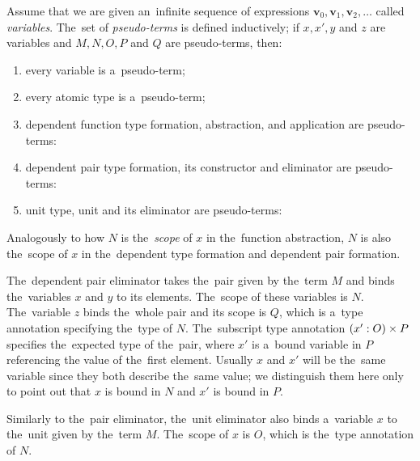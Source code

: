 \begin{definition}\label{def:pseudo-term}
  Assume that we are given an~infinite sequence of expressions $\mathbf{v}_0,
  \mathbf{v}_1, \mathbf{v}_2, \dots$ called \emph{variables}. The~set of
  \emph{pseudo-terms} is defined inductively; if $x, x', y$ and $z$ are
  variables and $M, N, O, P$ and $Q$ are pseudo-terms, then:
  \begin{enumerate}
    \item every variable is a~pseudo-term;
    \item every atomic type is a~pseudo-term;
    \item dependent function type formation, abstraction, and application
      are pseudo-terms:
    \item dependent pair type formation, its constructor and eliminator are
      pseudo-terms:
    \item unit type, unit and its eliminator are pseudo-terms:
  \end{enumerate}
\end{definition}
Analogously to how $N$ is the~\emph{scope} of $x$ in the~function abstraction,
$N$ is also the~scope of $x$ in the~dependent type formation and dependent pair
formation.

The~dependent pair eliminator takes the~pair given by the~term $M$ and binds
the~variables $x$ and $y$ to its elements. The~scope of these variables is $N$.
The~variable $z$ binds the~whole pair and its scope is $Q$, which is a~type
annotation specifying the~type of $N$. The~subscript type annotation
$(x' \overset{}: O)\times P$ specifies the~expected type of the~pair, where $x'$ is
a~bound variable in $P$ referencing the value of the~first element. Usually $x$
and $x'$ will be the~same variable since they both describe the~same value; we
distinguish them here only to point out that $x$ is bound in $N$ and $x'$ is
bound in $P$.

Similarly to the~pair eliminator, the~unit eliminator also binds a~variable $x$
to the~unit given by the~term $M$. The~scope of $x$ is $O$, which is the~type
annotation of $N$.

